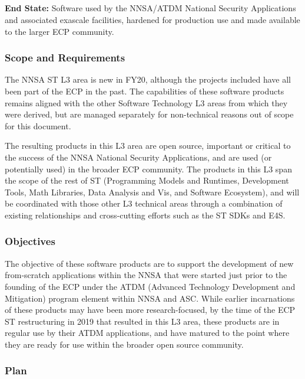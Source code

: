 \subsection{ \nnsa}\label{subsect:nnsa}

\textbf{End State:} Software used by the NNSA/ATDM National Security
Applications and associated exascale facilities, hardened for
production use and made available to the larger ECP community.

\subsubsection{Scope and Requirements}
The NNSA ST L3 area is new in FY20, although the projects included
have all been part of the ECP in the past. The capabilities of these
software products remains aligned with the other Software Technology
L3 areas from which they were derived, but are managed separately for
non-technical reasons out of scope for this document.

The resulting products in this L3 area 
are open source, important or critical to the success of the NNSA
National Security Applications, and are used (or potentially used) in
the broader ECP community. The products in this L3 span the scope of
the rest of ST (Programming Models and Runtimes, Development Tools,
Math Libraries, Data Analysis and Vis, and Software Ecosystem), and
will be coordinated with those other L3 technical 
areas through a combination of existing relationships and
cross-cutting efforts such as the ST SDKs and E4S.  

\subsubsection{Objectives}

The objective of these software products are to support the
development of new from-scratch applications within the NNSA that were
started just prior to the founding of the ECP under the ATDM (Advanced
Technology Development and Mitigation) program element within NNSA and
ASC. While earlier incarnations of these products may have been more
research-focused, by the time of the ECP ST restructuring in 2019 that
resulted in this L3 area, these products are in regular use by their
ATDM applications, and have matured to the point where they are ready
for use within the broader open source community.

\subsubsection{Plan}

